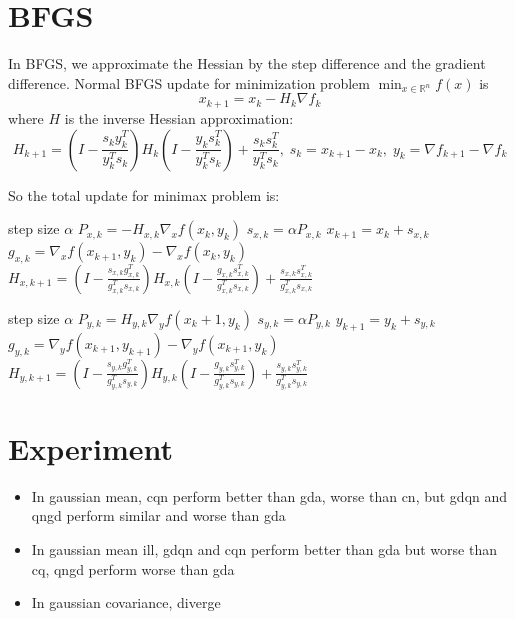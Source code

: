 \documentclass{article}
\begin{document}
\section{BFGS}

In BFGS, we approximate the Hessian by the step difference and the gradient difference.
Normal BFGS update for minimization problem $\min_{x \in \mathbb{R}^n}f(x)$ is 
\begin{equation}
    x_{k+1} = x_k - H_k \nabla f_k
\end{equation}
where $H$ is the inverse Hessian approximation:
\begin{equation}
    H_{k+1} = (I - \frac{s_k y_k^T}{y_k^T s_k})H_k(I - \frac{y_k s_k^T}{y_k^T s_k}) + \frac{s_k s_k^T}{y_k^T s_k},\; s_k = x_{k+1} - x_k,\; y_k = \nabla f_{k+1} - \nabla f_k
\end{equation}

So the total update for minimax problem is:
\begin{algorithm}
    \caption{BFGS for minimization problem}
    \begin{algorithmic}
        \State step size $\alpha$
        \State $P_{x,k} = -H_{x,k} \nabla_x f(x_k, y_k)$
        \State $s_{x,k} = \alpha P_{x,k}$
        \State $x_{k+1} = x_k + s_{x,k}$
        \State $g_{x,k} = \nabla_x f(x_{k+1}, y_k) - \nabla_x f(x_k, y_k)$
        \State $H_{x,k+1} = (I - \frac{s_{x,k} g_{x,k}^T}{g_{x,k}^T s_{x,k}})H_{x,k}(I - \frac{g_{x,k} s_{x,k}^T}{g_{x,k}^T s_{x,k}}) + \frac{s_{x,k} s_{x,k}^T}{g_{x,k}^T s_{x,k}}$
    \end{algorithmic}
\end{algorithm}
\begin{algorithm}
    \caption{BFGS update for maximization problem}
    \begin{algorithmic}
        \State step size $\alpha$
        \State $P_{y,k} = H_{y,k} \nabla_y f(x_k+1, y_k)$
        \State $s_{y,k} = \alpha P_{y,k}$
        \State $y_{k+1} = y_k + s_{y,k}$
        \State $g_{y,k} = \nabla_y f(x_{k+1}, y_{k+1}) - \nabla_y f(x_{k+1}, y_k)$
        \State $H_{y,k+1} = (I - \frac{s_{y,k} g_{y,k}^T}{g_{y,k}^T s_{y,k}})H_{y,k}(I - \frac{g_{y,k} s_{y,k}^T}{g_{y,k}^T s_{y,k}}) + \frac{s_{y,k} s_{y,k}^T}{g_{y,k}^T s_{y,k}}$
    \end{algorithmic}
\end{algorithm}

\section{Experiment}
\begin{itemize}
    \item In gaussian mean, cqn perform better than gda, worse than cn, but gdqn and qngd perform similar and worse than gda
    \item In gaussian mean ill, gdqn and cqn perform better than gda but worse than cq, qngd perform worse than gda
    \item In gaussian covariance, diverge
\end{itemize}
\end{document}
